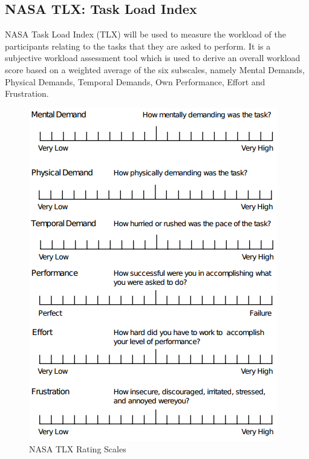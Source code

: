 \subsection{NASA TLX: Task Load Index}

NASA Task Load Index (TLX) will be used to measure the workload of the participants relating to the tasks that they are asked to perform. It is a subjective workload assessment tool which is used to derive an overall workload score based on a weighted average of the six subscales, namely Mental Demands, Physical Demands, Temporal Demands, Own Performance, Effort and Frustration\cite{tlx}.

\begin{figure}[H]
	\centering
	\includegraphics[scale=0.4]{../images/ratingscale.png}
	\caption{NASA TLX Rating Scales}
\end{figure}

